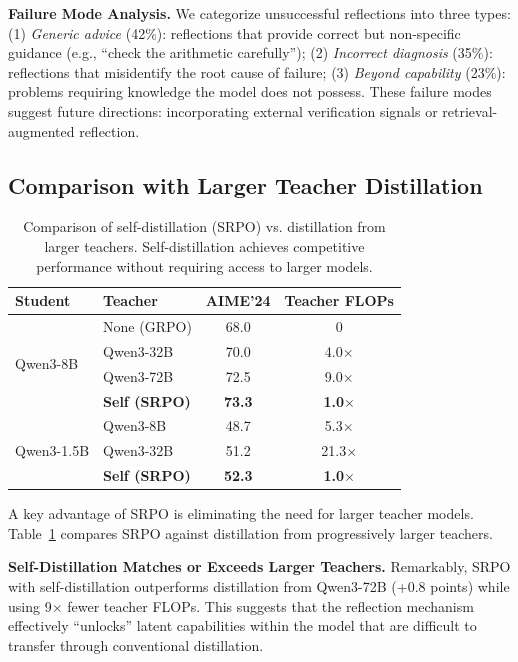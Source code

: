 \documentclass{article}
\newcommand{\method}{SRPO}
\theoremstyle{plain}
\theoremstyle{definition}
\theoremstyle{remark}
\begin{document}
\textbf{Failure Mode Analysis.}
We categorize unsuccessful reflections into three types:
(1) \textit{Generic advice} (42\%): reflections that provide correct but non-specific guidance (e.g., ``check the arithmetic carefully'');
(2) \textit{Incorrect diagnosis} (35\%): reflections that misidentify the root cause of failure;
(3) \textit{Beyond capability} (23\%): problems requiring knowledge the model does not possess.
These failure modes suggest future directions: incorporating external verification signals or retrieval-augmented reflection.


\subsection{Comparison with Larger Teacher Distillation}
\label{sec:teacher_comparison}

\begin{table}[t]
\centering
\caption{Comparison of self-distillation (\method{}) vs. distillation from larger teachers. Self-distillation achieves competitive performance without requiring access to larger models.}
\label{tab:teacher_comparison}
\vspace{0.5em}
\small
\begin{tabular}{@{}llcc@{}}
\toprule
\textbf{Student} & \textbf{Teacher} & \textbf{AIME'24} & \textbf{Teacher FLOPs} \\
\midrule
\multirow{4}{*}{Qwen3-8B} 
& None (GRPO) & 68.0 & 0 \\
& Qwen3-32B & 70.0 & 4.0$\times$ \\
& Qwen3-72B & 72.5 & 9.0$\times$ \\
& \textbf{Self (\method{})} & \textbf{73.3} & \textbf{1.0$\times$} \\
\midrule
\multirow{3}{*}{Qwen3-1.5B}
& Qwen3-8B & 48.7 & 5.3$\times$ \\
& Qwen3-32B & 51.2 & 21.3$\times$ \\
& \textbf{Self (\method{})} & \textbf{52.3} & \textbf{1.0$\times$} \\
\bottomrule
\end{tabular}
\end{table}

A key advantage of \method{} is eliminating the need for larger teacher models.
Table~\ref{tab:teacher_comparison} compares \method{} against distillation from progressively larger teachers.

\textbf{Self-Distillation Matches or Exceeds Larger Teachers.}
Remarkably, \method{} with self-distillation outperforms distillation from Qwen3-72B (+0.8 points) while using 9$\times$ fewer teacher FLOPs.
This suggests that the reflection mechanism effectively ``unlocks'' latent capabilities within the model that are difficult to transfer through conventional distillation.
\end{document}
